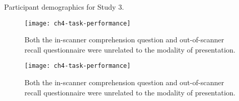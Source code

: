 \begin{table}[t]
	\renewcommand{\tabcolsep}{0.09cm}
	\centering
	
	\caption[Participant demographics for Study 3.]{Participant demographics for Study 3.}
	\label{table:ch4-participants}
\end{table}


\begin{figure}[t]
	\centering
	\texttt{[image: ch4-task-performance]}
    \caption[Behavioral metrics of passage performance were unrelated to modality.]{Both the in-scanner comprehension question and out-of-scanner recall questionnaire were unrelated to the modality of presentation.}
	\label{fig:ch4-task-performance}
\end{figure}


\begin{figure}[t]
	\centering
	\texttt{[image: ch4-task-performance]}
    \caption[Behavioral metrics of passage performance were unrelated to modality.]{Both the in-scanner comprehension question and out-of-scanner recall questionnaire were unrelated to the modality of presentation.}
	\label{fig:ch4-task-performance}
\end{figure}

\begin{figure}[t]
	\centering
    \caption[Similarity between reading and listening networks as a function of age.]{}
\end{figure}


